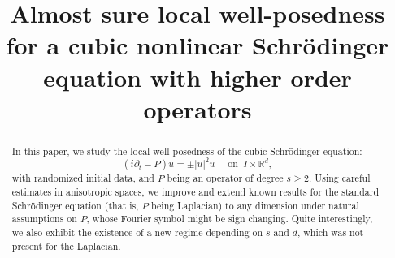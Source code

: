 \documentclass[aihp]{imsart}
\numberwithin{equation}{section}
\theoremstyle{plain}
\theoremstyle{remark}
\newcommand{\R}{\mathbb{R}}
\begin{document}
\begin{frontmatter}

\title{Almost sure local well-posedness for a cubic nonlinear Schr\" odinger equation with higher order operators}


\begin{abstract}
In this paper, we study the local well-posedness of the cubic  Schr\" odinger equation:
$$ (i\partial_t - P) u = \pm |u|^2 u\quad \textrm{ on }\ I\times \R^d ,$$
with randomized initial data, and $P$ being an operator of degree $s \geq 2$. Using careful estimates in anisotropic spaces, we improve and extend known results for the standard Schr\" odinger equation 
(that is, $P$ being  Laplacian) to any dimension under natural assumptions on $P$, whose Fourier symbol might be sign changing. 
Quite interestingly, we  also exhibit the existence of a new regime depending on $s$ and $d$, which was not present for the Laplacian. 
\end{abstract}


\end{frontmatter}
\end{document}
